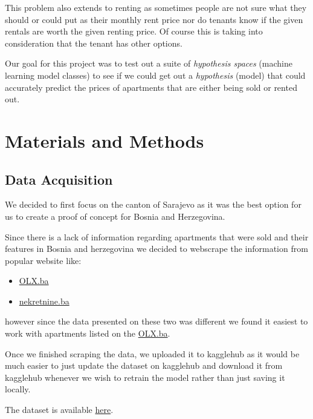 \documentclass[11pt]{article}
\begin{document}
		\noindent This problem also extends to renting as sometimes people are not sure what
		they should or could put as their monthly rent price nor do tenants know if the given rentals
		are worth the given renting price. Of course this is taking into consideration that the tenant has other options. \newline

		\noindent Our goal for this project was to test out a suite of \emph{hypothesis spaces} (machine learning model classes)
		to see if we could get out a \emph{hypothesis} (model) that could accurately predict the prices of apartments that are
		either being sold or rented out.

	\section{Materials and Methods}
		\subsection{Data Acquisition}
			\noindent We decided to first focus on the canton of Sarajevo as it was the best option
			for us to create a proof of concept for Bosnia and Herzegovina. \newline

			\noindent Since there is a lack of information regarding apartments that were sold and their
			features in Bosnia and herzegovina we decided to webscrape the information from popular website like:
			\begin{itemize}
				\item \href{https://olx.ba}{OLX.ba}
				\item \href{https://nekretnine.ba}{nekretnine.ba}
			\end{itemize}

			\noindent however since the data presented on these two was different we found it easiest
			to work with apartments listed on the \href{https://olx.ba}{OLX.ba}. \newline

			\noindent Once we finished scraping the data, we uploaded it to kagglehub
			as it would be much easier to just update the dataset on kagglehub and download it from kagglehub
			whenever we wish to retrain the model rather than just saving it locally. \newline

			\noindent The dataset is available \href{https://www.kaggle.com/datasets/mustafasinanovic/sarajevo-flats}{here}.
\end{document}
